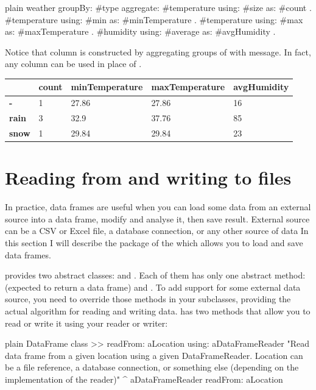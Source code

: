 \documentclass[10pt,twoside,english]{_support/latex/sbabook/sbabook}
\begin{document}
\begin{displaycode}{plain}
weather
  groupBy: #type
  aggregate: {
    #temperature using: #size as: #count .
    #temperature using: #min as: #minTemperature .
    #temperature using: #max as: #maxTemperature .
    #humidity using: #average as: #avgHumidity }.
\end{displaycode}

Notice that  column is constructed by aggregating groups of  with  message. In fact, any column can be used in place of .

\begin{tabular}{lllll}
\toprule
 & \textbf{count} & \textbf{minTemperature} & \textbf{maxTemperature} & \textbf{avgHumidity} \\
\midrule
\textbf{-} & 1 & 27.86 & 27.86 & 16 \\
\textbf{rain} & 3 & 32.9 & 37.76 & 85 \\
\textbf{snow} & 1 & 29.84 & 29.84 & 23 \\
\bottomrule
\end{tabular}
\section{Reading from and writing to files}
In practice, data frames are useful when you can load some data from an external source into a data frame, modify and analyse it, then save result. External source can be a CSV or Excel file, a database connection, or any other source of data In this section I will describe the  package of the  which allows you to load and save data frames.

 provides two abstract classes:  and . Each of them has only one abstract method:  (expected to return a data frame) and .
To add support for some external data source, you need to override those methods in your subclasses, providing the actual algorithm for reading and writing data.  has two methods that allow you to read or write it using your reader or writer:

\begin{displaycode}{plain}
DataFrame class >> readFrom: aLocation using: aDataFrameReader
  "Read data frame from a given location using a given DataFrameReader. Location can be a file reference, a database connection, or something else (depending on the implementation of the reader)"
  ^ aDataFrameReader readFrom: aLocation
\end{displaycode}
\end{document}
